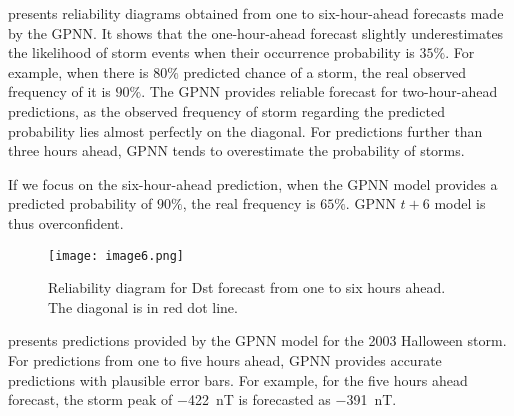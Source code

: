  presents reliability diagrams obtained from one to six-hour-ahead 
forecasts made by the GPNN. It shows that the one-hour-ahead forecast slightly underestimates the 
likelihood of storm events when their occurrence probability is $35\%$. For example, when there is 
$80\%$ predicted chance of a storm, the real observed frequency of it is $90\%$. The GPNN provides 
reliable forecast for two-hour-ahead predictions, as the observed frequency of storm regarding the 
predicted probability lies almost perfectly on the diagonal. For predictions further than three 
hours ahead, GPNN tends to overestimate the probability of storms. 

If we focus on the six-hour-ahead prediction, when the GPNN model provides a predicted probability 
of $90\%$, the real frequency is $65\%$. GPNN $t+6$ model is thus overconfident. 



\begin{figure}
	\texttt{[image: image6.png]}
	\caption{Reliability diagram for Dst forecast from one to six hours ahead. The diagonal is in red dot line.}
	\label{fig:gpnnreliability}
\end{figure}




 presents predictions provided by the GPNN model for the 2003 Halloween 
storm. For predictions from one to five hours ahead, GPNN provides accurate predictions with 
plausible error bars. For example, for the five hours ahead forecast, the storm peak of 
\SI{-422}{\nano\tesla} is forecasted as \SI{-391}{\nano\tesla}. 

